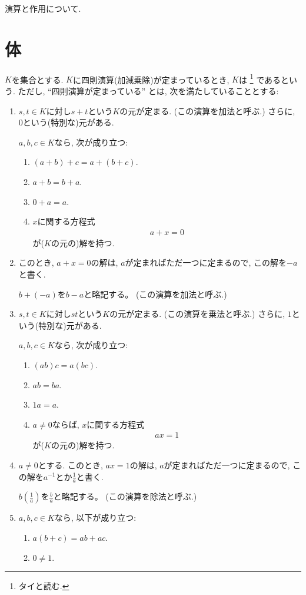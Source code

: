 演算と作用について.

\section{体}
$K$を集合とする.
$K$に四則演算(加減乗除)が定まっているとき,
$K$は
\footnote{タイと読む.}
であるという.
ただし,
``四則演算が定まっている''
とは, 次を満たしていることとする:
\begin{enumerate}
\item
  $s,t\in K$に対し$s+t$という$K$の元が定まる.
  (この演算を加法と呼ぶ.)
  さらに, $0$という(特別な)元がある.

  $a,b,c\in K$なら, 次が成り立つ:
  \begin{enumerate}
  \item
    $(a+b)+c=a+(b+c)$.
  \item
    $a+b=b+a$.
  \item
    $0+a=a$.
  \item
    $x$に関する方程式
    \begin{align*}
      a+x=0
    \end{align*}
    が($K$の元の)解を持つ.
  \end{enumerate}
\item
  このとき, $a+x=0$の解は,
  $a$が定まればただ一つに定まるので,
  この解を$-a$と書く.

  $b+(-a)$を$b-a$と略記する。
  (この演算を加法と呼ぶ.)

\item
  $s,t\in K$に対し$st$という$K$の元が定まる.
  (この演算を乗法と呼ぶ.)
  さらに, $1$という(特別な)元がある.

  $a,b,c\in K$なら, 次が成り立つ:
  \begin{enumerate}
  \item
    $(ab)c=a(bc)$.
  \item
    $ab=ba$.
  \item
    $1a=a$.
  \item
    $a\neq 0$ならば,
    $x$に関する方程式
    \begin{align*}
      ax=1
    \end{align*}
    が($K$の元の)解を持つ.
  \end{enumerate}

\item
  $a\neq 0$とする.
  このとき, $ax=1$の解は,
  $a$が定まればただ一つに定まるので,
  この解を$a^{-1}$とか$\frac{1}{a}$と書く.

  $b(\frac{1}{a})$を$\frac{b}{a}$と略記する。
  (この演算を除法と呼ぶ.)

\item
  $a,b,c\in K$なら, 以下が成り立つ:
  \begin{enumerate}
  \item $a(b+c)=ab+ac$.
  \item $0\neq 1$.
  \end{enumerate}
\end{enumerate}

